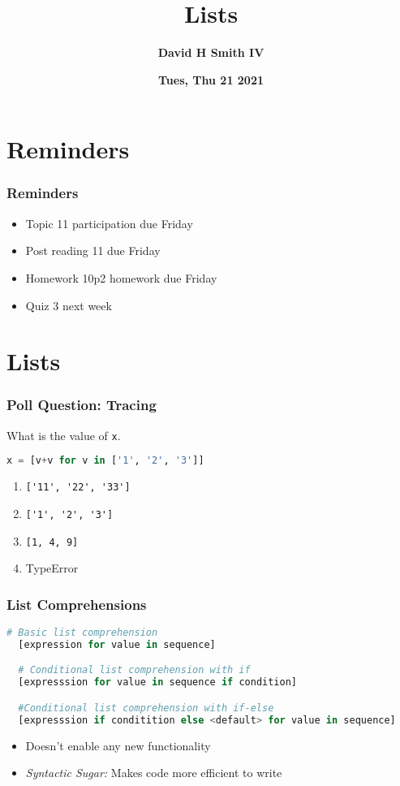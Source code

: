 \documentclass{beamer}
\title{\textbf{Lists}}
\author{\textbf{David H Smith IV}}
\institute[\textbf{UIUC}]{\textbf{University of Illinois Urbana-Champaign}}
\date{\textbf{Tues, Thu 21 2021}}
\begin{document}
\frame{\titlepage}

\section{Reminders}

%
%
\begin{frame}
  \frametitle{Reminders}
  \begin{itemize}
    \item Topic 11 participation due Friday
    \item Post reading 11 due Friday
    \item Homework 10p2 homework due Friday
    \item Quiz 3 next week 
  \end{itemize}
\end{frame}

\section{Lists}

%
%
\begin{frame}[fragile]
  \frametitle{Poll Question: Tracing}
  What is the value of \lstinline|x|.
  \begin{lstlisting}[language=Python, autogobble]
  x = [v+v for v in ['1', '2', '3']]
  \end{lstlisting}
  \vfill
  \begin{enumerate}[A]
    \item \lstinline|['11', '22', '33']| 
    \item \lstinline|['1', '2', '3']|
    \item \lstinline|[1, 4, 9]|
    \item TypeError
  \end{enumerate}
\end{frame}

%
%
\begin{frame}[fragile]
  \frametitle{List Comprehensions}
  \begin{lstlisting}[language=Python, autogobble]
  # Basic list comprehension
  [expression for value in sequence]

  # Conditional list comprehension with if
  [expresssion for value in sequence if condition]

  #Conditional list comprehension with if-else
  [expresssion if conditition else <default> for value in sequence]
  \end{lstlisting}
  \vfill
  \begin{itemize}
    \item Doesn't enable any new functionality 
    \item \textit{Syntactic Sugar: } Makes code more efficient to write
  \end{itemize}
\end{frame}
\end{document}
